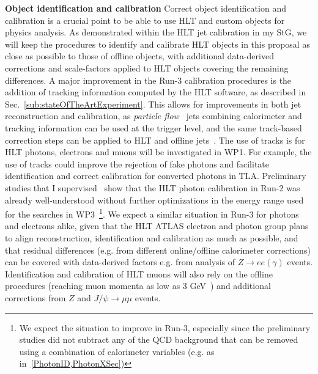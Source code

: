 \textbf{Object identification and calibration} Correct object identification and calibration is a crucial point to be able to use HLT and custom objects for physics analysis.
As demonstrated within the HLT jet calibration in my StG, we will keep the procedures to identify and calibrate HLT objects in this proposal as close as possible to those of offline objects, with additional data-derived corrections and scale-factors applied to HLT objects covering the remaining differences. 
A major improvement in the Run-3 calibration procedures is the addition of tracking information computed by the HLT software, as described in Sec.~\ref{sub:stateOfTheArtExperiment}. 
This allows for improvements in both jet reconstruction and calibration, as \textit{particle flow}~\cite{ToBeCited} %
jets combining calorimeter and tracking information can be used at the trigger level, and the same track-based correction steps can be applied to HLT and offline jets~\cite{ToBeCited}. %
The use of tracks is for HLT photons, electrons and muons will be investigated in WP1.   
For example, the use of tracks could improve the rejection of fake photons and facilitate identification and correct calibration for converted photons in TLA.  
Preliminary studies that I supervised~\cite{ToBeCited} %
show that the HLT photon calibration in Run-2 was already well-understood without further optimizations in the energy range used for the searches in WP3~\footnote{We expect the situation to improve in Run-3, especially since the preliminary studies did not subtract any of the QCD background that can be removed using a combination of calorimeter variables (e.g. as in~\ref{PhotonID,PhotonXSec})}. 
We expect a similar situation in Run-3 for photons and electrons alike, given that the HLT ATLAS electron and photon group plans to align reconstruction, identification and calibration as much as possible, and that residual differences (e.g. from different online/offline calorimeter corrections) can be covered with data-derived factors e.g. from analysis of $Z\rightarrow ee (\gamma)$ events.  
Identification and calibration of HLT muons will also rely on the offline procedures (reaching muon momenta as low as 3 GeV~\cite{ToBeCited}) %
and additional corrections from $Z$ and $J/\psi \rightarrow \mu\mu$ events. 


